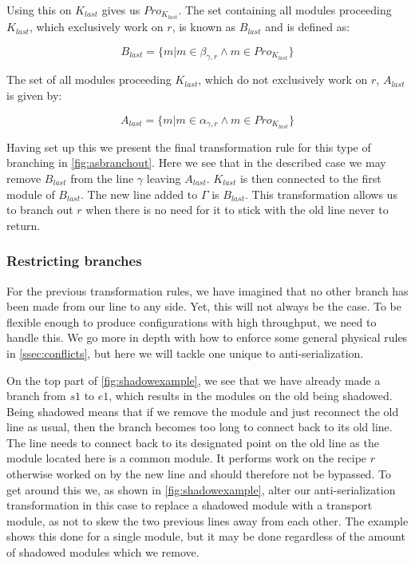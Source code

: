 Using this on $K_{last}$ gives us $Pro_{K_{last}}$. The set containing all modules proceeding $K_{last}$, which exclusively work on $r$, is known as $B_{last}$ and is defined as:

\[B_{last} = \{m | m \in \beta_{\gamma ,r}  \land m \in Pro_{K_{last}} \}\]

The set of all modules proceeding $K_{last}$, which do not exclusively work on $r$, $A_{last}$ is given by:

\[ A_{last} = \{m | m \in \alpha_{\gamma ,r}  \land m \in Pro_{K_{last}} \} \]

Having set up this we present the final transformation rule for this type of branching in \cref{fig:asbranchout}. Here we see that in the described case we may remove $B_{last}$ from the line $\gamma$ leaving  $A_{last}$. $K_{last}$ is then connected to the first module of $B_{last}$. The new line added to $\Gamma$ is $B_{last}$. This transformation allows us to branch out $r$ when there is no need for it to stick with the old line never to return.


\subsubsection{Restricting branches}
For the previous transformation rules, we have imagined that no other branch has been made from our line to any side. Yet, this will not always be the case. To be flexible enough to produce configurations with high throughput, we need to handle this. We go more in depth with how to enforce some general physical rules in \cref{ssec:conflicts}, but here we will tackle one unique to anti-serialization.

On the top part of \cref{fig:shadowexample}, we see that we have already made a branch from $s1$ to $e1$, which results in the modules on the old being shadowed. Being shadowed means that if we remove the module and just reconnect the old line as usual, then the branch becomes too long to connect back to its old line. The line needs to connect back to its designated point on the old line as the module located here is a common module. It performs work on the recipe $r$ otherwise worked on by the new line and should therefore not be bypassed.  To get around this we, as shown in \cref{fig:shadowexample}, alter our anti-serialization transformation in this case to replace a shadowed module with a transport module, as not to skew the two previous lines away from each other. The example shows this done for a single module, but it may be done regardless of the amount of shadowed modules which we remove.

